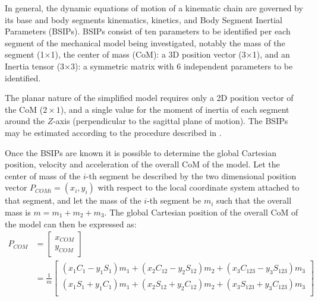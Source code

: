 \documentclass[12pt, a4paper]{article}
\begin{document}
\noindent In general, the dynamic equations of motion of a kinematic chain are governed by its base and body segments kinematics, kinetics, and Body Segment Inertial Parameters (BSIPs). BSIPs consist of ten parameters to be identified per each segment of the mechanical model being investigated, notably the mass of the segment (1$\times$1), the center of mass (CoM): a 3D position vector (3$\times$1), and an Inertia tensor (3$\times3$): a symmetric matrix with 6 independent parameters to be identified.\par
The planar nature of the simplified model requires only a 2D position vector of the CoM ($2\times1$), and a single value for the moment of inertia of each segment around the $Z$-axis (perpendicular to the sagittal plane of motion). The BSIPs may be estimated according to the procedure described in \cite{bonnet2017optimal}.\par
Once the BSIPs are known it is possible to determine the global Cartesian position, velocity and acceleration of the overall CoM of the model. Let the center of mass of the $i$-th segment be described by the two dimensional position vector $P_{COMi} = (x_i, y_i)$ with respect to the local coordinate system attached to that segment, and let the mass of the $i$-th segment be $m_i$ such that the overall mass is $m = m_1 + m_2 + m_3$. The global Cartesian position of the overall CoM of the model can then be expressed as:
\begin{equation}
\begin{split}
    P_{COM} &= 
    \begin{bmatrix}
    x_{COM}\\
    y_{COM}
    \end{bmatrix}
    \\
    &= \frac{1}{m}
    \begin{bmatrix}
    (x_1 C_1 - y_1 S_1) m_1 + (x_2 C_{12} - y_2 S_{12}) m_2 + (x_3 C_{123} - y_3 S_{123}) m_3\\
    (x_1 S_1 + y_1 C_1) m_1 + (x_2 S_{12} + y_2 C_{12}) m_2 + (x_3 S_{123} + y_3 C_{123}) m_3\\
    \end{bmatrix}
\end{split}
\end{equation}
\end{document}
